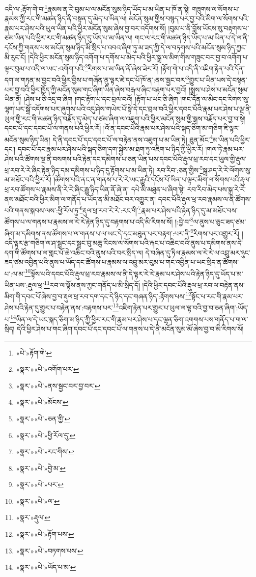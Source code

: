འདི་ལ་:རྟོག་གེ་བ་\footnote{«པེ་»རྟོག་གེ་}རྣམས་ན་རེ་བུམ་པ་ལ་མངོན་སུམ་ཉིད་ཡོད་པ་མ་ཡིན་པ་ཁོ་ན་སྟེ། གཟུགས་ལ་སོགས་པ་རྣམས་ཀྱི་རང་གི་མཚན་ཉིད་ནི་བསྟན་དུ་མེད་པ་ཡིན་ལ། མངོན་སུམ་གྱིས་བསྙད་པར་བྱ་བའི་མིག་ལ་སོགས་པའི་རྣམ་པར་ཤེས་པའི་ཡུལ་ཡིན་པའི་ཕྱིར་མངོན་སུམ་ཞེས་བྱ་བར་འདོགས་སོ། །བུམ་པ་ནི་བློས་ཡོངས་སུ་བརྟགས་པ་ཙམ་ཡིན་པའི་ཕྱིར་རང་གི་མཚན་ཉིད་དུ་ཡོད་པ་མ་ཡིན་ལ། གང་ལ་རང་གི་མཚན་ཉིད་ཡོད་པ་མ་ཡིན་པ་དེ་ལ་ནི་དངོས་ཀྱི་གནས་པས་མངོན་སུམ་ཉིད་མི་སྲིད་པ་འབའ་ཞིག་ཏུ་མ་ཟད་ཀྱི་དེ་ལ་བཏགས་པའི་མངོན་སུམ་ཉིད་ཀྱང་མི་རུང་ངོ། །དེའི་ཕྱིར་མངོན་སུམ་ཉིད་འགོག་པ་དགོས་པ་མེད་པའི་ཕྱིར་སྒྲ་ལ་མིག་གིས་གཟུང་བར་བྱ་བ་འགོག་པ་ལྟར་བུམ་པ་འདི་ལ་ཡང་:འགོག་པའི་\footnote{«སྣར་»«པེ་»འགོག་པར་}རིགས་པ་མ་ཡིན་ནོ་ཞེས་ཟེར་རོ། །རྟོག་གེ་པ་འདི་ནི་འཇིག་རྟེན་པའི་དོན་དག་ལ་གཏན་མ་བྱང་བའི་ཕྱིར་བྱིས་པ་གཞོན་ནུ་ལྟར་ཇེ་དང་པོ་ཁོ་ན་:ནས་སྦྱང་བར་\footnote{«སྣར་»«པེ་»ནས་སྦྱང་བར་བྱ་བར་}གྱུར་པ་ཡིན་པས་དེ་བསྟན་པར་བྱ་བའི་ཕྱིར་ཁྱོད་ཀྱི་མངོན་སུམ་གང་ཞིག་ཡིན་ཞེས་བརྒལ་ཞིང་བརྟག་པར་བྱའོ། །སྨྲས་པ་ཤེས་པ་མངོན་སུམ་ཡིན་ནོ། །ཤེས་པ་ཅི་འདྲ་བ་ཞིག །གང་རྟོག་པ་དང་བྲལ་བའོ། །རྟོག་པ་ཡང་ཅི་ཞིག །གང་དོན་ལ་མིང་དང་རིགས་སུ་ལྷག་པར་སྒྲོ་འདོགས་པར་ཞུགས་པའི་འདུ་ཤེས་གཡེར་པོ་སྟེ་དེ་དང་བྲལ་བའི་ཕྱིར་དབང་པོའི་རྣམ་པར་ཤེས་པ་ལྔ་ནི་ཡུལ་གྱི་རང་གི་མཚན་ཉིད་བརྗོད་དུ་མེད་པ་ཙམ་ཞིག་ལ་འཇུག་པའི་ཕྱིར་མངོན་སུམ་གྱི་སྒྲས་བརྗོད་པར་བྱ་བ་སྟེ། དབང་པོ་དང་དབང་པོ་ལ་གནས་པའི་ཕྱིར་རོ། །འོ་ན་དབང་པོའི་རྣམ་པར་ཤེས་པའི་སྐད་ཅིག་མ་གཅིག་ཇི་ལྟར་མངོན་སུམ་ཉིད་ཡིན། དེ་ནི་དབང་པོ་དང་དབང་པོ་ལ་བརྟེན་ནས་འཇུག་པ་མ་ཡིན་ཏེ། ཐུན་མོང་\footnote{«སྣར་»«པེ་»མོངས་}མ་ཡིན་པའི་ཕྱིར་དང་། དབང་པོ་དང་རྣམ་པར་ཤེས་པའི་སྐད་ཅིག་དག་སྐྱེས་མ་ཐག་ཏུ་འཇིག་པ་ཉིད་ཀྱི་ཕྱིར་རོ། །གལ་ཏེ་རྣམ་པར་ཤེས་པའི་ཚོགས་ལྔ་ནི་བསགས་པའི་རྟེན་དང་དམིགས་པ་ཅན་ཡིན་པས་དབང་པོའི་རྡུལ་ཕྲ་རབ་དང་ཡུལ་གྱི་རྡུལ་ཕྲ་རབ་རེ་རེ་ཞིང་རྟེན་ཉིད་དམ་དམིགས་པ་ཉིད་དུ་རྟོགས་པ་མ་ཡིན་ཏེ། རབ་རིབ་:ཅན་གྱིས་\footnote{«སྣར་»«པེ་»ཅན་གྱི་}སྐྲ་ཤད་རེ་རེ་ལོགས་སུ་མ་མཐོང་བའི་ཕྱིར་རོ། །ཚོགས་པའི་ནང་ན་གནས་པ་རེ་རེ་ཡང་རྒྱུའི་དངོས་པོ་ཡིན་པ་ལྟར་མིག་ལ་སོགས་པའི་རྡུལ་ཕྲ་རབ་ཚོགས་པ་རྣམས་ནི་རེ་རེ་ཞིང་རྒྱུ་ཉིད་ཡིན་ནོ་ཞེ་ན། དཔེ་མི་མཐུན་པ་ཞིག་སྟེ། རབ་རིབ་མེད་པས་སྐྲ་རེ་རེ་ནས་མཐོང་བའི་ཕྱིར་མིག་ལ་གནོད་པ་ཡོད་ན་མི་མཐོང་བར་འགྱུར་ན། དབང་པོའི་རྡུལ་ཕྲ་རབ་རྣམས་ལ་ནི་ཚོགས་པའི་གནས་སྐབས་ལས་:ཕྱི་རོལ་ཏུ་\footnote{«སྣར་»«པེ་»ཕྱི་རོལ་དུ་}རྡུལ་ཕྲ་རབ་རེ་རེ་:རང་གི་\footnote{«སྣར་»«པེ་»རང་གིས་}རྣམ་པར་ཤེས་པའི་རྟེན་ཉིད་དུ་མ་མཐོང་བས་ཚོགས་པ་ལ་གནས་པ་རྣམས་ལ་རེ་རེ་རྟེན་ཉིད་དུ་བརྟགས་པ་འདི་མི་རིགས་སོ། །:བྱེ་བ་\footnote{«སྣར་»«པེ་»བྱེ་མ་}ལ་ནུས་པ་ཅུང་ཟད་ཙམ་ཞིག་མ་དམིགས་ནས་ཚོགས་པ་ལ་གནས་པ་ལ་ཡང་དེ་དང་མཐུན་པར་བརྟག་:པར་ནི་\footnote{«སྣར་»«པེ་»པར་}རིགས་པར་འགྱུར་རོ། །འདི་ལྟར་རྩ་གཅིག་ལ་ཤ་སྦྲང་དང་སྦྲང་བུ་མཆུ་རིངས་ལ་སོགས་པའི་རྐང་པ་འཆིང་བའི་ནུས་པ་དམིགས་ནས་དེ་དག་གི་ཚོགས་པ་ལ་གླང་པོ་ཆེ་འཆིང་བའི་ནུས་པའི་བར་སྲིད་ལ། དེ་བཞིན་དུ་ཏིལ་རྣམས་ལ་རེ་རེ་ལ་འབྲུ་མར་ཉུང་ཟད་ཙམ་འབྱིན་པའི་ནུས་པ་ཡོད་དང་ཚོགས་པ་རྣམས་ལ་འབྲུ་མར་བུམ་པ་གང་འབྱིན་པ་ཡང་སྲིད་ན་ཚོགས་པ་:ལ་མ་\footnote{«སྣར་»«པེ་»ལ་}ལྟོས་པའི་དབང་པོའི་རྡུལ་ཕྲ་རབ་རྣམས་ལ་ནི་དེ་ལྟར་རེ་རེ་རྣམ་པར་ཤེས་པའི་རྟེན་ཉིད་དུ་ཡོད་པ་མ་ཡིན་པས་:རྡུལ་ཕྲ་\footnote{«སྣར་»རྡུལ་}རབ་ལ་ལྟོས་ནས་ཀྱང་གནོད་པ་མི་སྲིད་དོ། །དེའི་ཕྱིར་དབང་པོའི་རྡུལ་ཕྲ་རབ་ལ་བརྟེན་ནས་མིག་གི་དབང་པོ་ཞེས་བྱ་བ་རྡུལ་ཕྲ་རབ་དག་དང་དེ་ཉིད་དང་གཞན་ཉིད་:རྟོགས་པས་\footnote{«སྣར་»«པེ་»རྟོག་པས་}སྟོང་པ་རང་གི་རྣམ་པར་ཤེས་པའི་རྟེན་དུ་གྱུར་པ་བརྟེན་ནས་:བརྟགས་པར་\footnote{«སྣར་»«པེ་»བཏགས་པས་}འཇིག་རྟེན་པར་གྱུར་པ་ཡུལ་ལ་ལྟ་བའི་བྱ་བ་ཅན་ཞིག་:ཡོད་པ་\footnote{«སྣར་»«པེ་»ཡོད་པ་མ་}ཡིན་ལ་དེ་ཡང་སྐད་ཅིག་མ་ཉིད་ཀྱི་ཕྱིར་རང་གི་རྣམ་པར་ཤེས་པ་དང་ལྷན་ཅིག་འགགས་པས་གནོད་པ་ག་ལ་སྲིད། དེའི་ཕྱིར་ཤེས་པ་གང་ཞིག་དབང་པོ་དང་དབང་པོ་ལ་གནས་པ་དེ་ནི་མངོན་སུམ་མོ་ཞེས་བྱ་བ་མི་རིགས་སོ། 